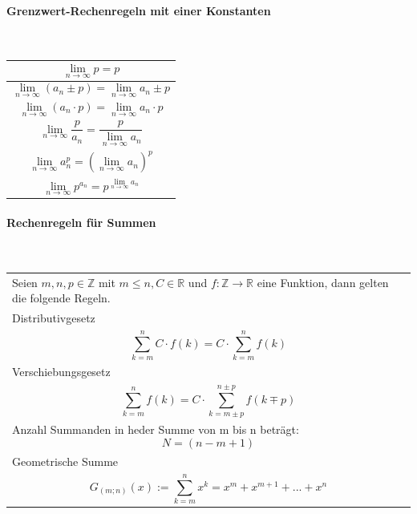 \paragraph{Grenzwert-Rechenregeln mit einer Konstanten}\mbox{}\\
\noindent
\begin{tabularx}{\columnwidth}{@{}X@{}}
    \hline
    \[ \lim_{n \to \infty} p = p \]                                             \\ \hline
    \[ \lim_{n \to \infty} (a_n \pm p ) = \lim_{n \to \infty} a_n \pm p \]      \\ \hline
    \[ \lim_{n \to \infty} (a_n \cdot p ) = \lim_{n \to \infty} a_n\cdot p \]   \\ \hline
    \[ \lim_{n \to \infty} \frac{p}{a_n} = \frac{p}{\lim_{n \to \infty} a_n} \] \\ \hline
    \[ \lim_{n \to \infty} a_n^p = (\lim_{n \to \infty} a_n)^p \]               \\ \hline
    \[ \lim_{n \to \infty} p^{a_n} = p^{\lim_{n \to \infty} a_n} \]             \\ \hline
\end{tabularx}
\vspace{1mm}

\paragraph{Rechenregeln für Summen}\mbox{}\\
\noindent
\begin{tabularx}{\columnwidth}{@{}X@{}}
    \hline
    Seien $m,n,p \in \mathbb{Z}$ mit $m\leq n,C \in \mathbb{R}$ und $f: \mathbb{Z} \to \mathbb{R}$ eine Funktion, dann gelten die folgende Regeln. \\
    Distributivgesetz                                                                                                                              \\
    \[ \sum_{k=m}^n C \cdot f(k) = C \cdot \sum_{k=m}^n f(k) \]                                                                                    \\ \hline
    Verschiebungsgesetz                                                                                                                            \\
    \[ \sum_{k=m}^n f(k) = C \cdot \sum_{k=m\pm p}^{n\pm p} f(k\mp p) \]                                                                           \\ \hline
    Anzahl Summanden in heder Summe von m bis n beträgt:
    \[ N = (n - m + 1) \]                                                                                                                          \\ \hline
    Geometrische Summe                                                                                                                             \\
    \[ G_{(m;n)}(x) := \sum_{k=m}^n x^k = x^m + x^{m+1} + ... + x^n \]                                                                             \\ \hline
\end{tabularx}
\vspace{1mm}

